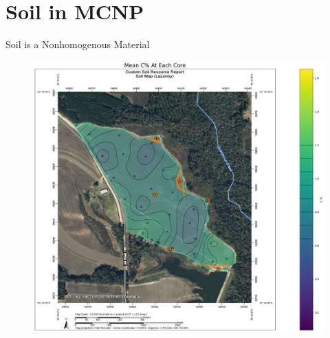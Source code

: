 \documentclass[10pt,hyperref={colorlinks,citecolor=blue,urlcolor=peking_blue,linkcolor=}]{beamer}
\theoremstyle{plain}
\begin{document}
\section{Soil in MCNP}
\begin{frame}{Soil is a Nonhomogenous Material}
\begin{figure}[Carbon case study over a field]
\begin{center}
\includegraphics[width=1\linewidth]{../Figures/CaseStudy/fieldstudy.png}
\end{center}
\end{figure}
\begin{figure}[Carbon case study over depth]
\begin{center}

\end{center}
\end{figure}
\end{frame}
\end{document}
